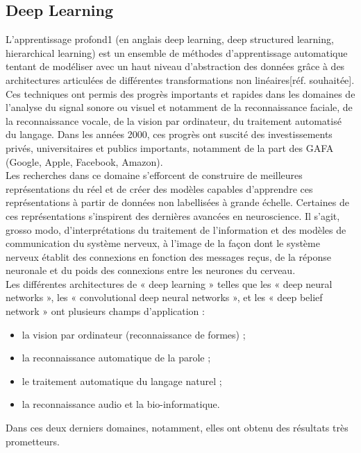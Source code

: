 \subsection{Deep Learning}
L'apprentissage profond1 (en anglais deep learning, deep structured learning, hierarchical learning) est un ensemble de méthodes d'apprentissage automatique tentant de modéliser avec un haut niveau d’abstraction des données grâce à des architectures articulées de différentes transformations non linéaires[réf. souhaitée]. Ces techniques ont permis des progrès importants et rapides dans les domaines de l'analyse du signal sonore ou visuel et notamment de la reconnaissance faciale, de la reconnaissance vocale, de la vision par ordinateur, du traitement automatisé du langage. Dans les années 2000, ces progrès ont suscité des investissements privés, universitaires et publics importants, notamment de la part des GAFA (Google, Apple, Facebook, Amazon).\\[0.5cm]
Les recherches dans ce domaine s’efforcent de construire de meilleures représentations du réel et de créer des modèles capables d’apprendre ces représentations à partir de données non labellisées à grande échelle. Certaines de ces représentations s’inspirent des dernières avancées en neuroscience. Il s'agit, grosso modo, d'interprétations du traitement de l’information et des modèles de communication du système nerveux, à l'image de la façon dont le système nerveux établit des connexions en fonction des messages reçus, de la réponse neuronale et du poids des connexions entre les neurones du cerveau.\\
Les différentes architectures de « deep learning » telles que les « deep neural networks », les « convolutional deep neural networks », et les « deep belief network » ont plusieurs champs d’application :
\begin{itemize}
\item la vision par ordinateur (reconnaissance de formes) ;
\item la reconnaissance automatique de la parole ;
\item le traitement automatique du langage naturel ;
\item la reconnaissance audio et la bio-informatique.
\end{itemize}
Dans ces deux derniers domaines, notamment, elles ont obtenu des résultats très prometteurs.
